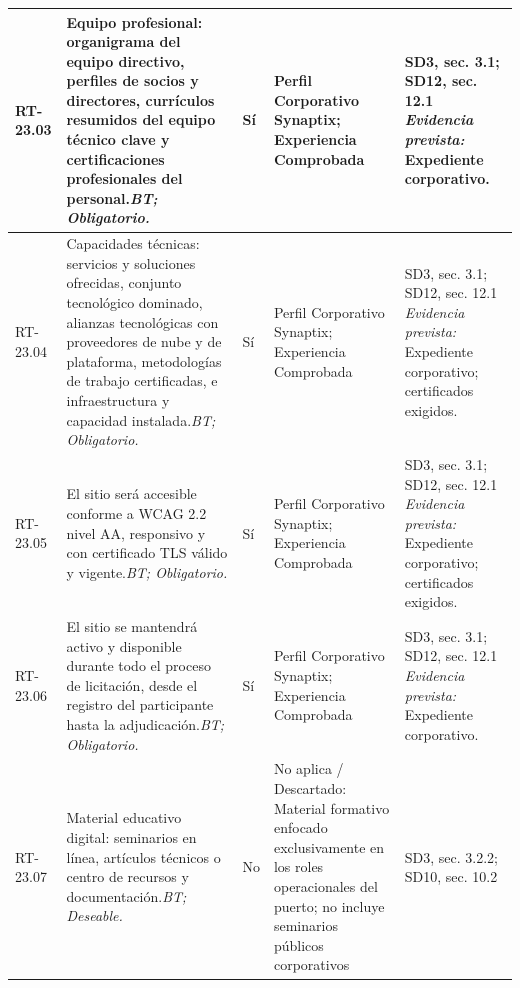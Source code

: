 \begin{paginaHorizontalSynaptix}
\begin{longtable}{|L{0.09\AnchoMatrizTDoce}|L{0.385\AnchoMatrizTDoce}|L{0.065\AnchoMatrizTDoce}|L{0.18\AnchoMatrizTDoce}|L{0.28\AnchoMatrizTDoce}|}
RT-\allowbreak{}23.\allowbreak{}03 &
Equipo profesional: organigrama del equipo directivo, perfiles de socios y directores, currículos resumidos del equipo técnico clave y certificaciones profesionales del personal.\newline\textit{BT; Obligatorio.} &
Sí &
Perfil Corporativo Synaptix; Experiencia Comprobada &
SD3, sec. 3.1; SD12, sec. 12.1 \newline\textit{Evidencia prevista:} Expediente corporativo. \\ \hline

RT-\allowbreak{}23.\allowbreak{}04 &
Capacidades técnicas: servicios y soluciones ofrecidas, conjunto tecnológico dominado, alianzas tecnológicas con proveedores de nube y de plataforma, metodologías de trabajo certificadas, e infraestructura y capacidad instalada.\newline\textit{BT; Obligatorio.} &
Sí &
Perfil Corporativo Synaptix; Experiencia Comprobada &
SD3, sec. 3.1; SD12, sec. 12.1 \newline\textit{Evidencia prevista:} Expediente corporativo; certificados exigidos. \\ \hline

RT-\allowbreak{}23.\allowbreak{}05 &
El sitio será accesible conforme a WCAG 2.2 nivel AA, responsivo y con certificado TLS válido y vigente.\newline\textit{BT; Obligatorio.} &
Sí &
Perfil Corporativo Synaptix; Experiencia Comprobada &
SD3, sec. 3.1; SD12, sec. 12.1 \newline\textit{Evidencia prevista:} Expediente corporativo; certificados exigidos. \\ \hline

RT-\allowbreak{}23.\allowbreak{}06 &
El sitio se mantendrá activo y disponible durante todo el proceso de licitación, desde el registro del participante hasta la adjudicación.\newline\textit{BT; Obligatorio.} &
Sí &
Perfil Corporativo Synaptix; Experiencia Comprobada &
SD3, sec. 3.1; SD12, sec. 12.1 \newline\textit{Evidencia prevista:} Expediente corporativo. \\ \hline

RT-\allowbreak{}23.\allowbreak{}07 &
Material educativo digital: seminarios en línea, artículos técnicos o centro de recursos y documentación.\newline\textit{BT; Deseable.} &
No &
No aplica / Descartado: Material formativo enfocado exclusivamente en los roles operacionales del puerto; no incluye seminarios públicos corporativos &
SD3, sec. 3.2.2; SD10, sec. 10.2 \\ \hline


\end{longtable}
\end{paginaHorizontalSynaptix}
